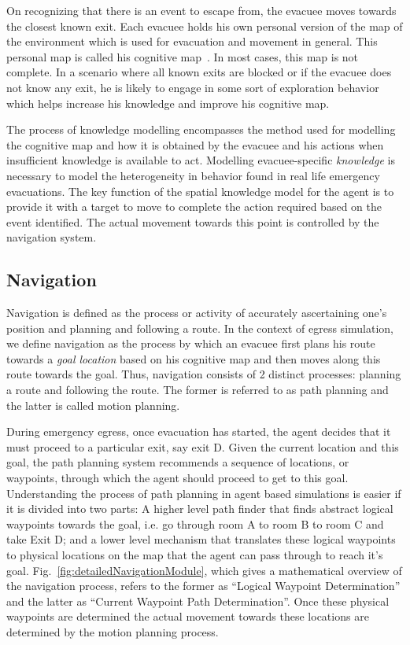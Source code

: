 	On recognizing that there is an event to escape from, the evacuee moves towards the closest known exit. Each evacuee holds his own personal version of the map of the environment which is used for evacuation and movement in general. This personal map is called his cognitive map~\cite{tolman1948}. In most cases, this map is not complete. In a scenario where all known exits are blocked or if the evacuee does not know any exit, he is likely to engage in some sort of exploration behavior which helps increase his knowledge and improve his cognitive map.

    The process of knowledge modelling encompasses the method used for modelling the cognitive map and how it is obtained by the evacuee and his actions when insufficient knowledge is available to act. Modelling evacuee-specific \emph{knowledge} is necessary to model the heterogeneity in behavior found in real life emergency evacuations. The key function of the spatial knowledge model for the agent is to provide it with a target to move to complete the action required based on the event identified. The actual movement towards this point is controlled by the navigation system.


\subsection{Navigation}
\label{IBEVAC:Navigation}

	Navigation is defined as the process or activity of accurately ascertaining one's position and planning and following a route. In the context of egress simulation, we define navigation as the process by which an evacuee first plans his route towards a \emph{goal location} based on his cognitive map and then moves along this route towards the goal. Thus, navigation consists of 2 distinct processes: planning a route and following the route. The former is referred to as path planning and the latter is called motion planning.

    During emergency egress, once evacuation has started, the agent decides that it must proceed to a particular exit, say exit D. Given the current location and this goal, the path planning system recommends a sequence of locations, or waypoints, through which the agent should proceed to get to this goal. Understanding the process of path planning in agent based simulations is easier if it is divided into two parts:  A higher level path finder that finds abstract logical waypoints towards the goal, i.e. go through room A to room B to room C and take Exit D; and a lower level mechanism that translates these logical waypoints to physical locations on the map that the agent can pass through to reach it's goal. Fig.~\ref{fig:detailedNavigationModule}, which gives a mathematical overview of the navigation process, refers to the former as ``Logical Waypoint Determination'' and the latter as ``Current Waypoint Path Determination''. Once these physical waypoints are determined the actual movement towards these locations are determined by the motion planning process.

